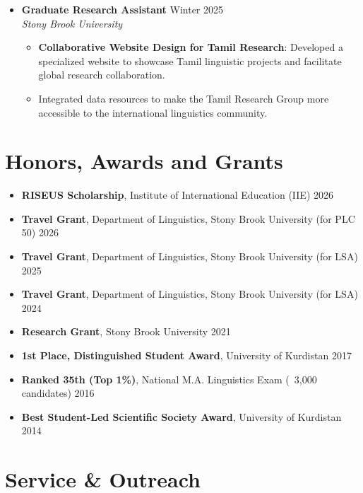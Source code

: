 \documentclass[a4paper,10pt]{article}
\begin{document}
\begin{itemize}[leftmargin=0.5cm, label={}]
    \item \textbf{Graduate Research Assistant} \hfill Winter 2025 \\
    \textit{Stony Brook University}
    \begin{itemize}[leftmargin=0.5cm, label={$\bullet$}]
        \item \textbf{Collaborative Website Design for Tamil Research}: Developed a specialized website to showcase Tamil linguistic projects and facilitate global research collaboration.
        \item Integrated data resources to make the Tamil Research Group more accessible to the international linguistics community.
    \end{itemize}
\end{itemize}

\section*{Honors, Awards and Grants}
\begin{itemize}[leftmargin=0.5cm, label={$\bullet$}]
    \item \textbf{RISEUS Scholarship}, Institute of International Education (IIE) \hfill 2026
    \item \textbf{Travel Grant}, Department of Linguistics, Stony Brook University (for PLC 50) \hfill 2026
    \item \textbf{Travel Grant}, Department of Linguistics, Stony Brook University (for LSA) \hfill 2025
    \item \textbf{Travel Grant}, Department of Linguistics, Stony Brook University (for LSA) \hfill 2024
    \item \textbf{Research Grant}, Stony Brook University \hfill 2021
    \item \textbf{1st Place, Distinguished Student Award}, University of Kurdistan \hfill 2017
    \item \textbf{Ranked 35th (Top 1\%)}, National M.A. Linguistics Exam (~3,000 candidates) \hfill 2016
    
    \item \textbf{Best Student-Led Scientific Society Award}, University of Kurdistan \hfill 2014
\end{itemize}


\section*{Service \& Outreach}
\end{document}
